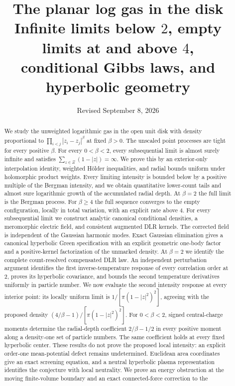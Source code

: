 \documentclass[11pt,a4paper]{article}
\title{The planar log gas in the disk\\[3pt]
\large Infinite limits below $2$, empty limits at and above $4$,\\
conditional Gibbs laws, and hyperbolic geometry}
\author{}
\date{Revised September 8, 2026}
\numberwithin{equation}{section}
\theoremstyle{definition}
\theoremstyle{remark}
\begin{document}
\maketitle
\vspace{-1.5em}
\begin{abstract}
We study the unweighted logarithmic gas in the open unit disk with
density proportional to $\prod_{i<j}|z_i-z_j|^\beta$ at fixed $\beta>0$.
The unscaled point processes are tight for every positive $\beta$.
For every $0<\beta<2$, every subsequential limit is almost surely
infinite and satisfies $\sum_{z\in\Xi}(1-|z|)=\infty$. We prove this
by an exterior-only interpolation identity,
weighted H\"older inequalities, and radial bounds uniform under
holomorphic product weights. Every limiting intensity is bounded
below by a positive multiple of the Bergman intensity, and we obtain
quantitative lower-count tails and almost sure logarithmic growth of
the accumulated radial depth.
At $\beta=2$ the full limit is the Bergman process. For $\beta\ge4$
the full sequence converges to the empty configuration, locally in total
variation, with an explicit rate above $4$.
For every subsequential limit we construct analytic canonical
conditional densities, a meromorphic electric field, and consistent
augmented DLR kernels. The corrected field is independent of the
Gaussian harmonic modes. Exact Gaussian elimination gives a canonical
hyperbolic Green specification with an explicit geometric one-body
factor and a positive-kernel factorization of the unmarked density.
At $\beta=2$ we identify the complete count-resolved compensated DLR law.
An independent perturbation argument identifies the first inverse-temperature
response of every correlation order at $2$, proves its hyperbolic
covariance, and bounds the second temperature derivatives uniformly
in particle number. We now evaluate the second intensity response at every
interior point: its locally uniform limit is $1/[\pi(1-|z|^2)^2]$,
agreeing with the proposed density
$(4/\beta-1)/[\pi(1-|z|^2)^2]$. For $0<\beta<2$, signed central-charge
moments determine the radial-depth coefficient $2/\beta-1/2$ in every
positive moment along a density-one set of particle numbers. The same
coefficient holds at every fixed hyperbolic center. These results do not
prove the proposed local intensity: an explicit order-one mean-potential
defect remains undetermined. Euclidean area coordinates give an exact
screening equation, and a neutral hyperbolic plasma representation identifies
the conjecture with local neutrality. We prove an energy obstruction at the
moving finite-volume boundary and an exact connected-force correction to the

\end{abstract}
\end{document}
